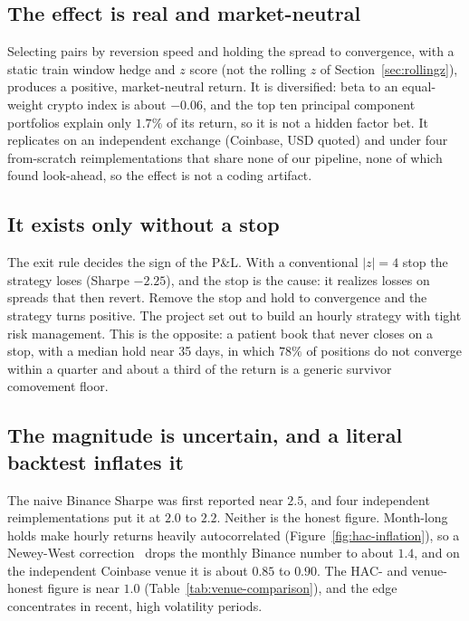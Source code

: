 \documentclass[11pt]{article}
\begin{document}
\subsection{The effect is real and market-neutral}

Selecting pairs by reversion speed and holding the spread to convergence, with a static
train window hedge and $z$ score (not the rolling $z$ of Section~\ref{sec:rollingz}), produces a
positive, market-neutral return. It is diversified: beta to an equal-weight crypto index is about $-0.06$,
and the top ten principal component portfolios explain only $1.7\%$ of its return, so it is not a
hidden factor bet. It replicates on an independent exchange (Coinbase, USD quoted) and under four
from-scratch reimplementations that share none of our pipeline, none of which found look-ahead,
so the effect is not a coding artifact.

\subsection{It exists only without a stop}

The exit rule decides the sign of the P\&L. With a conventional $|z| = 4$ stop the strategy loses
(Sharpe $-2.25$), and the stop is the cause: it realizes losses on spreads that then revert.
Remove the stop and hold to convergence and the strategy turns positive. The project set out to
build an hourly strategy with tight risk management. This is the opposite: a patient book that
never closes on a stop, with a median hold near 35 days, in which $78\%$ of positions do not converge within a quarter and
about a third of the return is a generic survivor comovement floor.

\subsection{The magnitude is uncertain, and a literal backtest inflates it}

The naive Binance Sharpe was first reported near $2.5$, and four independent reimplementations put
it at $2.0$ to $2.2$. Neither is the honest figure. Month-long holds make hourly returns heavily
autocorrelated (Figure~\ref{fig:hac-inflation}), so a Newey-West correction~\cite{newey1987hac}
drops the monthly Binance number to about $1.4$, and
on the independent Coinbase venue it is about $0.85$ to $0.90$. The HAC- and venue-honest figure
is near $1.0$ (Table~\ref{tab:venue-comparison}), and the edge concentrates in recent, high volatility periods.
\end{document}
